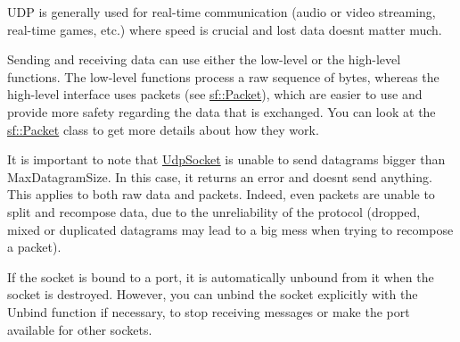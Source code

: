 U\+DP is generally used for real-\/time communication (audio or video streaming, real-\/time games, etc.) where speed is crucial and lost data doesn\textquotesingle{}t matter much.

Sending and receiving data can use either the low-\/level or the high-\/level functions. The low-\/level functions process a raw sequence of bytes, whereas the high-\/level interface uses packets (see \hyperlink{classsf_1_1Packet}{sf\+::\+Packet}), which are easier to use and provide more safety regarding the data that is exchanged. You can look at the \hyperlink{classsf_1_1Packet}{sf\+::\+Packet} class to get more details about how they work.

It is important to note that \hyperlink{classsf_1_1UdpSocket}{Udp\+Socket} is unable to send datagrams bigger than Max\+Datagram\+Size. In this case, it returns an error and doesn\textquotesingle{}t send anything. This applies to both raw data and packets. Indeed, even packets are unable to split and recompose data, due to the unreliability of the protocol (dropped, mixed or duplicated datagrams may lead to a big mess when trying to recompose a packet).

If the socket is bound to a port, it is automatically unbound from it when the socket is destroyed. However, you can unbind the socket explicitly with the Unbind function if necessary, to stop receiving messages or make the port available for other sockets.

